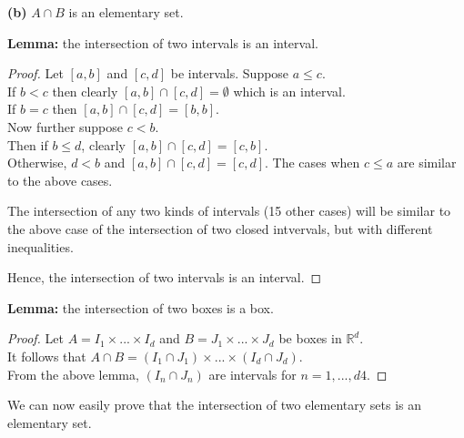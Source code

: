 \documentclass[12pt]{article}
\begin{document}
	\hspace{-4 ex}\textbf{(b)} $A \cap B$ is an elementary set. \bigbreak
	
	\textbf{Lemma:} the intersection of two intervals is an interval.
	
	\begin{proof}
		Let $[a,b]$ and $[c,d]$ be intervals. \bigbreak
		Suppose $a \leq c$. \\
		If $ b < c$ then clearly $[a,b] \cap [c,d] = \emptyset$ which is an interval. \\
		If $b=c$ then $[a,b] \cap [c,d] = [b,b]$. \\
		Now further suppose $ c < b$. \\
		Then if $b \leq d$, clearly $[a,b] \cap [c,d] = [c,b]$. \\
		Otherwise, $ d < b$ and $[a,b] \cap [c,d] = [c,d]$. \bigbreak
		The cases when $c \leq a$ are similar to the above cases. \bigbreak
		
		The intersection of any two kinds of intervals (15 other cases) will be similar to the above case of the intersection of two closed intvervals, but with different inequalities. \bigbreak
		
		Hence, the intersection of two intervals is an interval.		
	\end{proof}

	\textbf{Lemma:} the intersection of two boxes is a box.
	
	\begin{proof}
		Let $A = I_{1} \times ... \times I_{d}$ and $B = J_{1} \times ... \times J_{d}$ be boxes in $\mathds{R}^{d}$. \\
		It follows that $A \cap B = (I_{1} \cap J_{1}) \times ... \times (I_{d} \cap J_{d})$. \\
		From the above lemma, $(I_{n} \cap J_{n})$ are intervals for $n=1,...,d4$.
	\end{proof}

	We can now easily prove that the intersection of two elementary sets is an elementary set.
	
\end{document}
